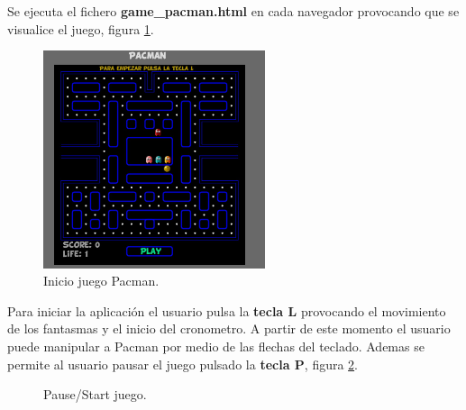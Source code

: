 Se ejecuta el fichero \textbf{game\_pacman.html} en cada navegador provocando que se visualice el juego, figura \ref{fig:InitGame}.
\begin{figure}[!h]
\centering
\includegraphics[width=65mm]{Figures/InitGame}
\decoRule
\caption[Inicio Juego]{Inicio juego Pacman.}
\label{fig:InitGame}
\end{figure}

Para iniciar la aplicación el usuario pulsa la \textbf{tecla L}  provocando el movimiento de los fantasmas y el inicio del cronometro. A partir de este momento el usuario puede manipular a Pacman por medio de las flechas del teclado. Ademas se permite al usuario pausar el juego pulsado la \textbf{tecla P}, figura \ref{fig:Pause/Start game}.
\begin{figure}[!h]
\centering
{}\hspace{5mm}
\caption{Pause/Start juego.} \label{fig:Pause/Start game}
\end{figure}

